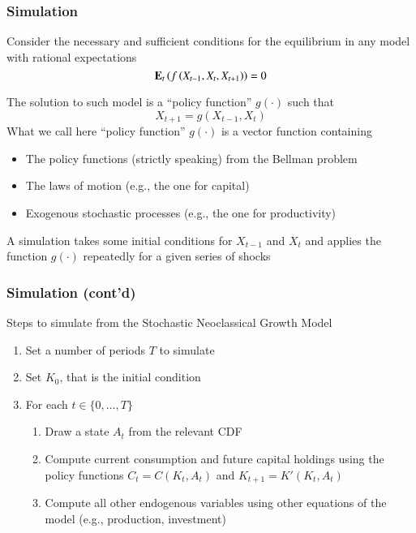 \documentclass[10pt, aspectratio=1610, handout]{beamer}
\begin{document}
  \begin{frame}
    \frametitle{Simulation}

    Consider the necessary and sufficient conditions for the equilibrium in any model with rational expectations
    \begin{equation*}
      \mathbf{E}_t \left( f \left( X_{t-1}, X_t, X_{t+1} \right) \right) = 0
    \end{equation*}

    \vfill\pause

    The solution to such model is a ``policy function'' $g(\cdot)$ such that
    \begin{equation*}
      X_{t+1} = g(X_{t-1}, X_t)
    \end{equation*}
    What we call here ``policy function'' $g(\cdot)$ is a vector function containing
    \begin{itemize}
      \item The policy functions (strictly speaking) from the Bellman problem
      \item The laws of motion (e.g., the one for capital)
      \item Exogenous stochastic processes (e.g., the one for productivity)
    \end{itemize}

    \vfill\pause

    A simulation takes some initial conditions for $X_{t-1}$ and $X_t$ and applies the function $g(\cdot)$ repeatedly for a given series of shocks

  \end{frame}

  \begin{frame}
    \frametitle{Simulation (cont'd)}

    Steps to simulate from the Stochastic Neoclassical Growth Model

    \vfill\pause

    \begin{enumerate}
      \item Set a number of periods $T$ to simulate
      \vfill\pause
      \item Set $K_0$, that is the initial condition
      \vfill\pause
      \item For each $t \in \{0, \ldots, T\}$
      \vfill\pause
        \begin{enumerate}
          \item Draw a state $A_t$ from the relevant CDF
          \vfill\pause
          \item Compute current consumption and future capital holdings using the policy functions $C_t = C(K_t, A_t)$ and $K_{t+1} = K'(K_t, A_t)$
          \vfill\pause
          \item Compute all other endogenous variables using other equations of the model (e.g., production, investment)
        \end{enumerate}
    \end{enumerate}

  \end{frame}
\end{document}
